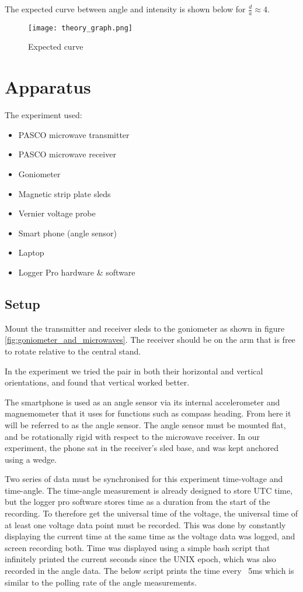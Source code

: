 The expected curve between angle and intensity is shown below for $\frac{d}{a} \approx 4$.
\begin{figure}[h]
\centering
\texttt{[image: theory\_graph.png]}
\caption{Expected curve}
\label{fig:ExpectedCurve}
\end{figure}

\section*{Apparatus}

The experiment used:
\begin{itemize}
\item PASCO microwave transmitter
\item PASCO microwave receiver
\item Goniometer
\item Magnetic strip plate sleds
\item Vernier voltage probe
\item Smart phone (angle sensor)
\item Laptop
\item Logger Pro hardware \& software
\end{itemize}

\subsection*{Setup}

Mount the transmitter and receiver sleds to the goniometer as shown in figure \ref{fig:goniometer_and_microwaves}. The receiver should be on the arm that is free to rotate relative to the central stand.

In the experiment we tried the pair in both their horizontal and vertical orientations, and found that vertical worked better.

The smartphone is used as an angle sensor via its internal accelerometer and magnemometer that it uses for functions such as compass heading. From here it will be referred to as the angle sensor. The angle sensor must be mounted flat, and be rotationally rigid with respect to the microwave receiver. In our experiment, the phone sat in the receiver's sled base, and was kept anchored using a wedge.

Two series of data must be synchronised for this experiment \textemdash time-voltage and time-angle. The time-angle measurement is already designed to store UTC time, but the logger pro software stores time as a duration from the start of the recording. To therefore get the universal time of the voltage, the universal time of at least one voltage data point must be recorded. This was done by constantly displaying the current time at the same time as the voltage data was logged, and screen recording both. Time was displayed using a simple bash script that infinitely printed the current seconds since the UNIX epoch, which was also recorded in the angle data. The below script prints the time every ~5ms which is similar to the polling rate of the angle measurements.


